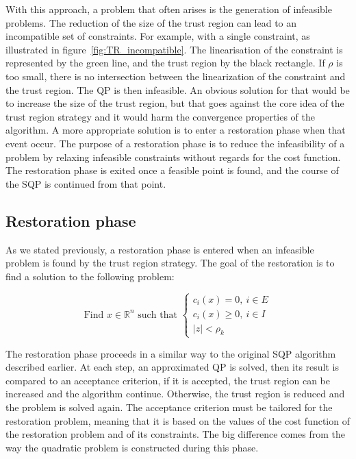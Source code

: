 With this approach, a problem that often arises is the generation of infeasible problems.
The reduction of the size of the trust region can lead to an incompatible set of constraints.
For example, with a single constraint, as illustrated in figure~\ref{fig:TR_incompatible}.
The linearisation of the constraint is represented by the green line, and the trust region by the black rectangle.
If $\rho$ is too small, there is no intersection between the linearization of the constraint and the trust region.
The QP is then infeasible.
An obvious solution for that would be to increase the size of the trust region, but that goes against the core idea of the trust region strategy and it would harm the convergence properties of the algorithm.
A more appropriate solution is to enter a restoration phase when that event occur.
The purpose of a restoration phase is to reduce the infeasibility of a problem by relaxing infeasible constraints without regards for the cost function.
The restoration phase is exited once a feasible point is found, and the course of the SQP is continued from that point.

\subsection{Restoration phase}
\label{sub:restoration_phase}

As we stated previously, a restoration phase is entered when an infeasible problem is found by the trust region strategy.
The goal of the restoration is to find a solution to the following problem:

\begin{equation}
    \text{Find $x\in\mathbb{R}^n$ such that }
    \left\{
    \begin{array}{l}
      c_i(x)=0,\ i\in E \\
      c_i(x)\geq 0,\ i\in I\\
      |z|<\rho_k
    \end{array}
    \right.
\label{eq:resto_NL}
\end{equation}

The restoration phase proceeds in a similar way to the original SQP algorithm described earlier.
At each step, an approximated QP is solved, then its result is compared to an acceptance criterion, if it is accepted, the trust region can be increased and the algorithm continue.
Otherwise, the trust region is reduced and the problem is solved again.
The acceptance criterion must be tailored for the restoration problem, meaning that it is based on the values of the cost function of the restoration problem and of its constraints.
The big difference comes from the way the quadratic problem is constructed during this phase.

